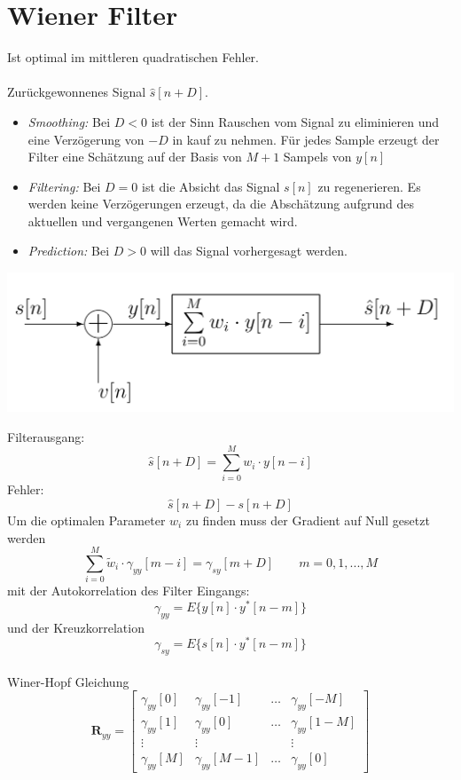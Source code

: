 \section{Wiener Filter}
Ist optimal im mittleren quadratischen Fehler.\\
\\
Zurückgewonnenes Signal $\hat{s}[n+D]$.
\begin{itemize}
	\item \textit{Smoothing:} Bei $D<0$ ist der Sinn Rauschen vom Signal zu
	eliminieren und eine Verzögerung von $-D$ in kauf zu nehmen. Für jedes Sample
	erzeugt der Filter eine Schätzung auf der Basis von $M+1$ Sampels von $y[n]$
	\item \textit{Filtering:} Bei $D=0$ ist die Absicht das Signal $s[n]$ zu regenerieren.
	Es werden keine Verzögerungen erzeugt, da die Abschätzung aufgrund des 
	aktuellen und vergangenen Werten gemacht wird.
	\item \textit{Prediction:} Bei $D>0$ will das Signal vorhergesagt werden.
\end{itemize} 
\begin{center}
	\includegraphics[scale=.7]{../fig/wiener_filter}
\end{center}
Filterausgang:
\[ \hat{s}[n+D] = \sum_{i=0}^{M}w_i\cdot y[n-i] \]
Fehler:
\[ \hat{s}[n+D] - s[n+D] \]
Um die optimalen Parameter $w_i$ zu finden muss der Gradient auf Null gesetzt 
werden
\[ \sum_{i=0}^{M}\tilde{w}_i \cdot \gamma_{yy}[m-i] = \gamma_{sy}[m+D] \qquad
	m=0,1,...,M \]
mit der Autokorrelation des Filter Eingangs:
\[ \gamma_{yy} = E\{ y[n] \cdot y^*[n-m] \} \]
und der Kreuzkorrelation
\[ \gamma_{sy} = E \{ s[n] \cdot y^*[n-m] \} \]
~\\
Winer-Hopf Gleichung
\[ \textbf{R}_{yy} = \begin{bmatrix}
	\gamma_{yy}[0]	& \gamma_{yy}[-1]	& \ldots	& \gamma_{yy}[-M]\\
	\gamma_{yy}[1]	& \gamma_{yy}[0]	& \ldots	& \gamma_{yy}[1-M]\\
	\vdots			& \vdots			&			& \vdots\\
	\gamma_{yy}[M]	& \gamma_{yy}[M-1]	& \ldots	& \gamma_{yy}[0]
\end{bmatrix}\]
